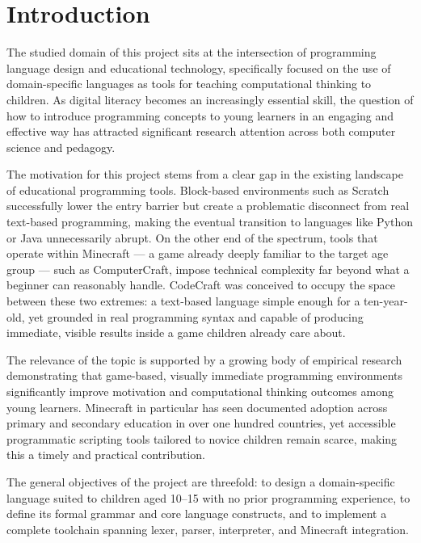 \chapter*{Introduction}

The studied domain of this project sits at the intersection of programming language design 
and educational technology, specifically focused on the use of domain-specific languages as 
tools for teaching computational thinking to children. As digital literacy becomes an 
increasingly essential skill, the question of how to introduce programming concepts to young 
learners in an engaging and effective way has attracted significant research attention across 
both computer science and pedagogy.

The motivation for this project stems from a clear gap in the existing landscape of 
educational programming tools. Block-based environments such as Scratch successfully lower 
the entry barrier but create a problematic disconnect from real text-based programming, 
making the eventual transition to languages like Python or Java unnecessarily abrupt. On the 
other end of the spectrum, tools that operate within Minecraft --- a game already deeply 
familiar to the target age group --- such as ComputerCraft, impose technical complexity far 
beyond what a beginner can reasonably handle. CodeCraft was conceived to occupy the space 
between these two extremes: a text-based language simple enough for a ten-year-old, yet 
grounded in real programming syntax and capable of producing immediate, visible results 
inside a game children already care about.

The relevance of the topic is supported by a growing body of empirical research demonstrating 
that game-based, visually immediate programming environments significantly improve motivation 
and computational thinking outcomes among young learners. Minecraft in particular has seen 
documented adoption across primary and secondary education in over one hundred countries, yet 
accessible programmatic scripting tools tailored to novice children remain scarce, making 
this a timely and practical contribution.

The general objectives of the project are threefold: to design a domain-specific language 
suited to children aged 10--15 with no prior programming experience, to define its formal 
grammar and core language constructs, and to implement a complete toolchain spanning lexer,
parser, interpreter, and Minecraft integration.

